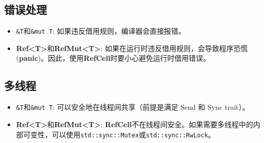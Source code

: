 \documentclass[oneside]{book}
\begin{document}
{    \subsection{错误处理}{
        \begin{itemize}
            \item \texttt{\&T}和\texttt{\&mut T}: 如果违反借用规则，编译器会直接报错。
            \item \textbf{Ref<T>}和\textbf{RefMut<T>}: 如果在运行时违反借用规则，会导致程序恐慌(\textbf{panic})。因此，使用\textbf{RefCell}时要小心避免运行时借用错误。
        \end{itemize}
    }

    \subsection{多线程}{
        \begin{itemize}
            \item \texttt{\&T}和\texttt{\&mut T}: 可以安全地在线程间共享（前提是满足 Send 和 Sync trait）。
            \item \textbf{Ref<T>}和\textbf{RefMut<T>}: \textbf{RefCell}不在线程间安全。如果需要多线程中的内部可变性，可以使用\texttt{std::sync::Mutex}或\texttt{std::sync::RwLock}。
        \end{itemize}
    }
}

\end{document}
